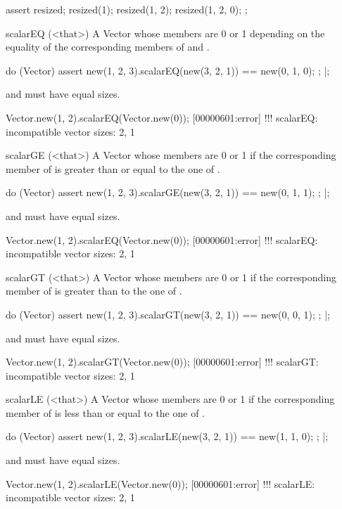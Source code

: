 \begin{urbiscriptapi}
\begin{urbiscript}
assert
{
  resized;
  resized(1);
  resized(1, 2);
  resized(1, 2, 0);
};
\end{urbiscript}


\item[scalarEQ](<that>)%
  A Vector whose members are 0 or 1 depending on the equality of the
  corresponding members of \this and \that.
\begin{urbiscript}
do (Vector)
{
  assert
  {
    new(1, 2, 3).scalarEQ(new(3, 2, 1)) == new(0, 1, 0);
  };
}|;
\end{urbiscript}
  \this and \that must have equal sizes.
\begin{urbiscript}
Vector.new(1, 2).scalarEQ(Vector.new(0));
[00000601:error] !!! scalarEQ: incompatible vector sizes: 2, 1
\end{urbiscript}


\item[scalarGE](<that>)%
  A Vector whose members are 0 or 1 if the corresponding member of \this is
  greater than or equal to the one of \that.
\begin{urbiscript}
do (Vector)
{
  assert
  {
    new(1, 2, 3).scalarGE(new(3, 2, 1)) == new(0, 1, 1);
  };
}|;
\end{urbiscript}
  \this and \that must have equal sizes.
\begin{urbiscript}
Vector.new(1, 2).scalarEQ(Vector.new(0));
[00000601:error] !!! scalarEQ: incompatible vector sizes: 2, 1
\end{urbiscript}


\item[scalarGT](<that>)%
  A Vector whose members are 0 or 1 if the corresponding member of \this is
  greater than to the one of \that.
\begin{urbiscript}
do (Vector)
{
  assert
  {
    new(1, 2, 3).scalarGT(new(3, 2, 1)) == new(0, 0, 1);
  };
}|;
\end{urbiscript}
  \this and \that must have equal sizes.
\begin{urbiscript}
Vector.new(1, 2).scalarGT(Vector.new(0));
[00000601:error] !!! scalarGT: incompatible vector sizes: 2, 1
\end{urbiscript}


\item[scalarLE](<that>)%
  A Vector whose members are 0 or 1 if the corresponding member of \this is
  less than or equal to the one of \that.
\begin{urbiscript}
do (Vector)
{
  assert
  {
    new(1, 2, 3).scalarLE(new(3, 2, 1)) == new(1, 1, 0);
  };
}|;
\end{urbiscript}
  \this and \that must have equal sizes.
\begin{urbiscript}
Vector.new(1, 2).scalarLE(Vector.new(0));
[00000601:error] !!! scalarLE: incompatible vector sizes: 2, 1
\end{urbiscript}



\end{urbiscriptapi}
